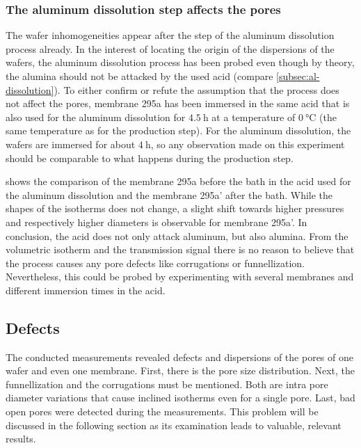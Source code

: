 \documentclass[../thesis.tex]{subfiles}
\begin{document}
        \subsubsection{The aluminum dissolution step affects the pores}
        \label{sssec:al-diss-bath}

          The wafer inhomogeneities appear after the step of the aluminum dissolution process already. In the interest of locating the origin of the dispersions of the wafers, the aluminum dissolution process has been probed even though by theory, the alumina should not be attacked by the used acid (compare \cref{subsec:al-dissolution}). To either confirm or refute the assumption that the process does not affect the pores, membrane 295a has been immersed in the same acid that is also used for the aluminum dissolution for $\SI{4,5}{\hour}$ at a temperature of $\SI{0}{\celsius}$ (the same temperature as for the production step). For the aluminum dissolution, the wafers are immersed for about $\SI{4}{\hour}$, so any observation made on this experiment should be comparable to what happens during the production step.
          \medskip

           shows the comparison of the membrane 295a before the bath in the acid used for the aluminum dissolution and the membrane 295a' after the bath. While the shapes of the isotherms does not change, a slight shift towards higher pressures and respectively higher diameters is observable for membrane 295a'. In conclusion, the acid does not only attack aluminum, but also alumina. From the volumetric isotherm and the transmission signal there is no reason to believe that the process causes any pore defects like corrugations or funnellization. Nevertheless, this could be probed by experimenting with several membranes and different immersion times in the acid.

          


    \subsection{Defects}
    \label{subsec:defects}

        The conducted measurements revealed defects and dispersions of the pores of one wafer and even one membrane. First, there is the pore size distribution. Next, the funnellization and the corrugations must be mentioned. Both are intra pore diameter variations that cause inclined isotherms even for a single pore. Last, bad open pores were detected during the measurements. This problem will be discussed in the following section as its examination leads to valuable, relevant results.
\end{document}
